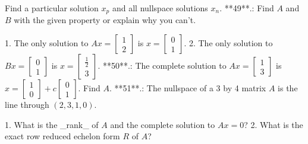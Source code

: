 Find a particular solution \(x_{p}\) and all nullspace solutions \(x_{n}\).
**49**.: Find \(A\) and \(B\) with the given property or explain why you can't.

1. The only solution to \(Ax=\begin{bmatrix}1\\ 2\end{bmatrix}\) is \(x=\begin{bmatrix}0\\ 1\end{bmatrix}\).
2. The only solution to \(Bx=\begin{bmatrix}0\\ 1\end{bmatrix}\) is \(x=\begin{bmatrix}\frac{1}{2}\\ 3\end{bmatrix}\).
**50**.: The complete solution to \(Ax=\begin{bmatrix}1\\ 3\end{bmatrix}\) is \(x=\begin{bmatrix}1\\ 0\end{bmatrix}+c\begin{bmatrix}0\\ 1\end{bmatrix}\). Find \(A\).
**51**.: The nullspace of a 3 by 4 matrix \(A\) is the line through \((2,3,1,0)\).

1. What is the _rank_ of \(A\) and the complete solution to \(Ax=0\)?
2. What is the exact row reduced echelon form \(R\) of \(A\)?